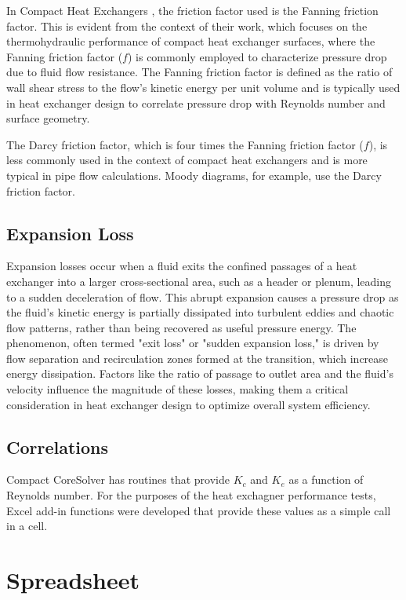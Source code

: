 \documentclass[12pt]{article}
\begin{document}
In Compact Heat Exchangers \cite{kaysandlondon}, the friction factor used is the Fanning friction factor. This is evident from the context of their work, which focuses on the thermohydraulic performance of compact heat exchanger surfaces, where the Fanning friction factor ($f$) is commonly employed to characterize pressure drop due to fluid flow resistance. The Fanning friction factor is defined as the ratio of wall shear stress to the flow’s kinetic energy per unit volume and is typically used in heat exchanger design to correlate pressure drop with Reynolds number and surface geometry.

The Darcy friction factor, which is four times the Fanning friction factor ($f$), is less commonly used in the context of compact heat exchangers and is more typical in pipe flow calculations. Moody diagrams, for example, use the Darcy friction factor.

\subsection{Expansion Loss}
Expansion losses occur when a fluid exits the confined passages of a heat exchanger into a larger cross-sectional area, such as a header or plenum, leading to a sudden deceleration of flow. This abrupt expansion causes a pressure drop as the fluid's kinetic energy is partially dissipated into turbulent eddies and chaotic flow patterns, rather than being recovered as useful pressure energy. The phenomenon, often termed "exit loss" or "sudden expansion loss," is driven by flow separation and recirculation zones formed at the transition, which increase energy dissipation. Factors like the ratio of passage to outlet area and the fluid's velocity influence the magnitude of these losses, making them a critical consideration in heat exchanger design to optimize overall system efficiency.

\subsection{Correlations}
Compact CoreSolver has routines that provide $K_c$ and $K_e$ as a function of Reynolds number. For the purposes of the heat exchagner performance tests, Excel add-in functions were developed that provide these values as a simple call in a cell.


\section{Spreadsheet}
\end{document}
